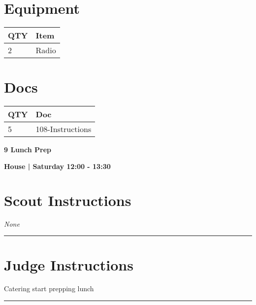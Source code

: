 \documentclass[10pt]{article}
\newcommand{\newtitle}[1]{\begin{center}{\Huge\bfseries #1 }\\ \vspace{5mm}\end{center}}
\newcommand{\newsubtitle}[1]{\begin{center}{\color{grey}\Large\bfseries #1 }\\ \vspace{5mm}\end{center}}
\begin{document}
	\begin{multicols}{2}

		\section*{\faWrench \: Equipment}

		
	\begin{center}
			\begin{tabular}{p{2cm}p{4cm}}


				\textbf{QTY} & \textbf{Item} \\\toprule
												2&Radio\\\midrule
								\end{tabular}

			\end{center}

		
		\vfill\null
		\columnbreak

			\section*{\faFile \: Docs}
		 	\begin{center}
			\begin{tabular}{p{2cm}p{4cm}}

			\textbf{QTY} & \textbf{Doc} \\\toprule
										5&108-Instructions\\\midrule
							\end{tabular}
			\end{center}
	

		\vfill\null

		\end{multicols}



	\vspace{1cm}


	\clearpage
		\newtitle{9 Lunch Prep }
	\newsubtitle{House | Saturday 12:00 - 13:30}
		\setcounter{section}{8}
	\section*{Scout Instructions}
		\textit{None}
	
	\vspace{0.5cm}
	\hrule
	\vspace{0.5cm}

		\section*{Judge Instructions}
		Catering start prepping lunch
\vspace{0.5cm}
	\hrule
	\vspace{0.5cm}
\end{document}
